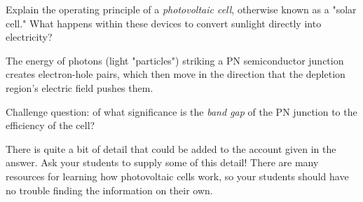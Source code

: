 

Explain the operating principle of a {\it photovoltaic cell}, otherwise known as a "solar cell."  What happens within these devices to convert sunlight directly into electricity?







The energy of photons (light "particles") striking a PN semiconductor junction creates electron-hole pairs, which then move in the direction that the depletion region's electric field pushes them.

\vskip 10pt

Challenge question: of what significance is the {\it band gap} of the PN junction to the efficiency of the cell?







There is quite a bit of detail that could be added to the account given in the answer.  Ask your students to supply some of this detail!  There are many resources for learning how photovoltaic cells work, so your students should have no trouble finding the information on their own.




